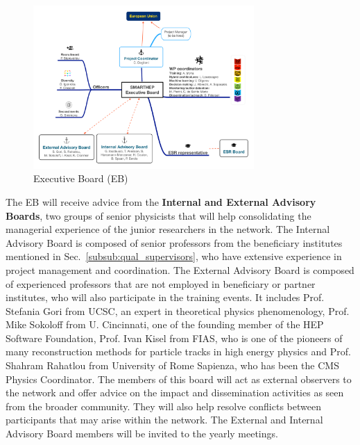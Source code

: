 \begin{figure}
\begin{center}
\includegraphics[width=0.75\textwidth]{figs/ManagementStructure.pdf} %
\caption{\acronym Executive Board (EB)}
\label{fig:management}
\end{center}
\vspace{-5mm}
\end{figure}


The EB will receive advice from the \textbf{Internal and External Advisory Boards}, two groups of senior physicists that will help consolidating the managerial experience of the junior researchers in the network. 
The Internal Advisory Board is composed of senior professors from the beneficiary institutes mentioned in Sec.~\ref{subsub:qual_supervisors}, who have extensive experience in project management and coordination. 
The External Advisory Board is composed of experienced professors that are not employed in beneficiary or partner institutes, who will also participate in the training events. 
It includes Prof. Stefania Gori from UCSC, an expert in theoretical physics phenomenology, Prof. Mike Sokoloff from U. Cincinnati, one of the founding member of the HEP Software Foundation, Prof. Ivan Kisel from FIAS, who is one of the pioneers of many reconstruction methods for particle tracks in high energy physics and Prof. Shahram Rahatlou from University of Rome Sapienza, who has been the CMS Physics Coordinator. %
The members of this board will act as external observers to the network and offer advice on the impact and dissemination activities as seen from the broader community. 
They will also help resolve conflicts between participants that may arise within the network.
The External and Internal Advisory Board members will be invited to the \acronym yearly meetings. 

